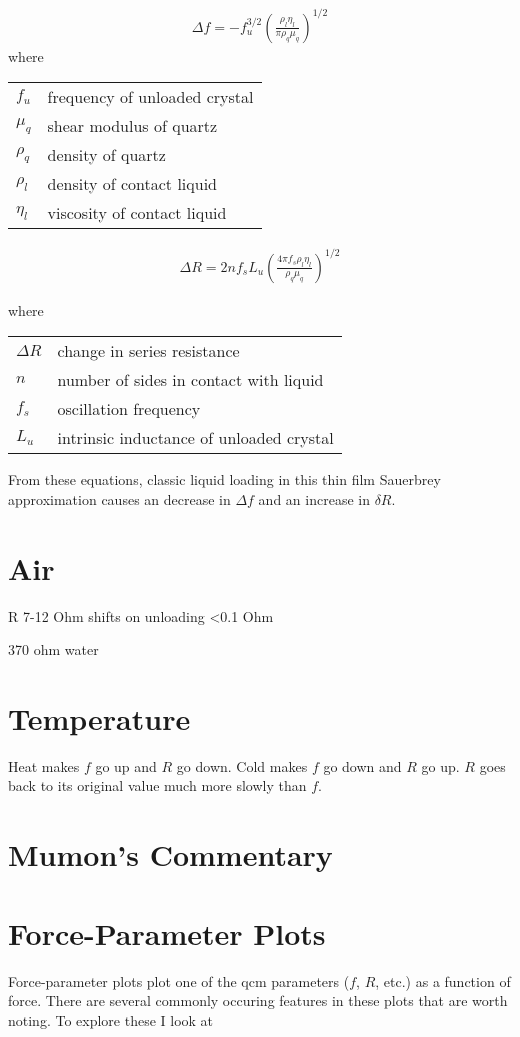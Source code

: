 \documentclass[a4paper]{article}
\begin{document}
\begin{align}
 \Delta f = -f_u^{3/2} \left(\frac{\rho_l \eta_l}{\pi \rho_q \mu_q}\right)^{1/2}
\end{align}
where

\begin{tabular}{ll}
$f_u$     & frequency of unloaded crystal \\
$\mu_q$   & shear modulus of quartz \\
$\rho_q$  & density of quartz \\
$\rho_l$  & density of contact liquid \\
$\eta_l$   & viscosity of contact liquid
\end{tabular}

\begin{align}
 \Delta R = 2 n f_s L_u \left(\frac{4 \pi f_s \rho_l \eta_l}{\rho_q \mu_q}\right)^{1/2}
\end{align}

where
\begin{tabular}{ll}
$\Delta R$ & change in series resistance \\
$n$        & number of sides in contact with liquid \\
$f_s$      & oscillation frequency \\
$L_u$      & intrinsic inductance of unloaded crystal \\
\end{tabular}

From these equations, classic liquid loading in this thin film Sauerbrey
approximation causes an decrease in $\Delta f$ and an increase in $\delta
R$.

\section{Air}
R 7-12 Ohm
shifts on unloading <0.1 Ohm

370 ohm water

\section{Temperature}
Heat makes $f$ go up and $R$ go down.  Cold makes $f$ go down and $R$ go
up.  $R$ goes back to its original value much more slowly than $f$.

\section{Mumon's Commentary}

\section{Force-Parameter Plots}
Force-parameter plots plot one of the \gls{qcm} parameters ($f$, $R$, etc.) as a
function of force.  There are several commonly occuring features in these
plots that are worth noting.  To explore these I look at
\end{document}
